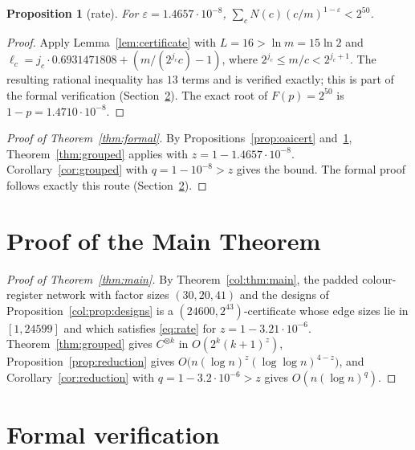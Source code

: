\documentclass[11pt]{article}
\newtheorem{proposition}[theorem]{Proposition}
\theoremstyle{definition}
\theoremstyle{remark}
\begin{document}
\begin{proposition}[rate]\label{prop:oairate}
For $\varepsilon=1.4657\cdot10^{-8}$, $\sum_cN(c)(c/m)^{1-\varepsilon}<2^{50}$.
\end{proposition}
\begin{proof}
Apply Lemma~\ref{lem:certificate} with $L=16>\ln m=15\ln2$ and
$\ell_c=j_c\cdot0.6931471808+(m/(2^{j_c}c)-1)$, where $2^{j_c}\le m/c<2^{j_c+1}$. The resulting
rational inequality has $13$ terms and is verified exactly; this is part of the formal verification
(Section~\ref{sec:formal}). The exact root
of $F(p)=2^{50}$ is $1-p=1.4710\cdot10^{-8}$.
\end{proof}

\begin{proof}[Proof of Theorem~\ref{thm:formal}]
By Propositions~\ref{prop:oaicert} and~\ref{prop:oairate}, Theorem~\ref{thm:grouped} applies with
$z=1-1.4657\cdot10^{-8}$. Corollary~\ref{cor:grouped} with $q=1-10^{-8}>z$ gives the bound. The
formal proof follows exactly this route (Section~\ref{sec:formal}).
\end{proof}



\section{Proof of the Main Theorem}\label{sec:proofmain}
\begin{proof}[Proof of Theorem~\ref{thm:main}]
By Theorem~\ref{col:thm:main}, the padded colour-register network with factor sizes $(30,20,41)$ and
the designs of Proposition~\ref{col:prop:designs} is a $(24600,2^{43})$-certificate whose edge sizes
lie in $[1,24599]$ and which satisfies \eqref{eq:rate} for $z=1-3.21\cdot10^{-6}$.
Theorem~\ref{thm:grouped} gives $C^{\otimes k}$ in $O(2^k(k+1)^z)$, Proposition~\ref{prop:reduction}
gives $O\big(n(\log n)^z(\log\log n)^{4-z}\big)$, and Corollary~\ref{cor:reduction} with
$q=1-3.2\cdot10^{-6}>z$ gives $O(n(\log n)^q)$.
\end{proof}

\section{Formal verification}\label{sec:formal}
\end{document}
